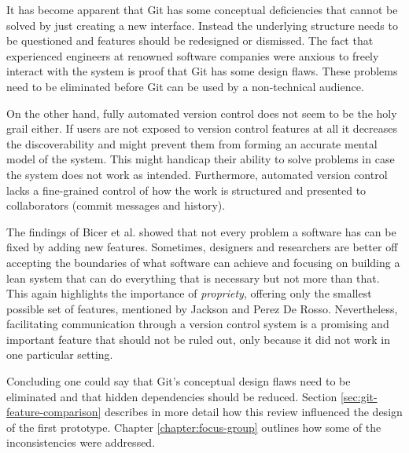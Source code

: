 It has become apparent that Git has some conceptual deficiencies that cannot be solved by just creating a new interface. Instead the underlying structure needs to be questioned and features should be redesigned or dismissed. The fact that experienced engineers at renowned software companies were anxious to freely interact with the system is proof that Git has some design flaws. These problems need to be eliminated before Git can be used by a non-technical audience.

On the other hand, fully automated version control does not seem to be the holy grail either. If users are not exposed to version control features at all it decreases the discoverability and might prevent them from forming an accurate mental model of the system. This might handicap their ability to solve problems in case the system does not work as intended. Furthermore, automated version control lacks a fine-grained control of how the work is structured and presented to collaborators (commit messages and history).

The findings of Bicer et al. showed that not every problem a software has can be fixed by adding new features. Sometimes, designers and researchers are better off accepting the boundaries of what software can achieve and focusing on building a lean system that can do everything that is necessary but not more than that. This again highlights the importance of \textit{propriety}, offering only the smallest possible set of features, mentioned by Jackson and Perez De Rosso. Nevertheless, facilitating communication through a version control system is a promising and important feature that should not be ruled out, only because it did not work in one particular setting.

Concluding one could say that Git's conceptual design flaws need to be eliminated and that hidden dependencies should be reduced. Section \ref{sec:git-feature-comparison} describes in more detail how this review influenced the design of the first prototype. Chapter \ref{chapter:focus-group} outlines how some of the inconsistencies were addressed.


